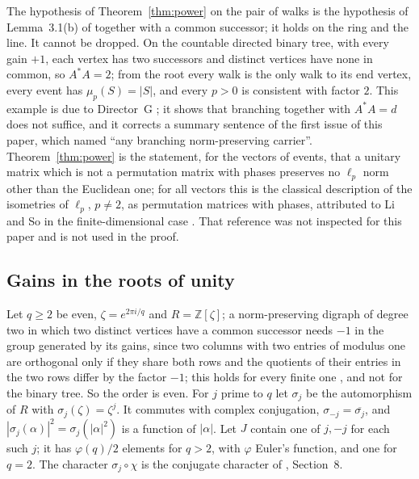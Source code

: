 The hypothesis of Theorem~\ref{thm:power} on the pair of walks is the hypothesis of Lemma~3.1(b) of \cite{g9} together with a common successor; it holds on the ring and the line. It cannot be dropped. On the countable directed binary tree, with every gain $+1$, each vertex has two successors and distinct vertices have none in common, so $A^*A=2$; from the root every walk is the only walk to its end vertex, every event has $\mu_p(S)=|S|$, and every $p>0$ is consistent with factor $2$. This example is due to Director~G \cite{dg}; it shows that branching together with $A^*A=d$ does not suffice, and it corrects a summary sentence of the first issue of this paper, which named ``any branching norm-preserving carrier''. Theorem~\ref{thm:power} is the statement, for the vectors of events, that a unitary matrix which is not a permutation matrix with phases preserves no $\ell_p$ norm other than the Euclidean one; for all vectors this is the classical description of the isometries of $\ell_p$, $p\ne2$, as permutation matrices with phases, attributed to Li and So in the finite-dimensional case \cite{liso}. That reference was not inspected for this paper and is not used in the proof.

\subsection{Gains in the roots of unity}
Let $q\ge2$ be even, $\zeta=e^{2\pi i/q}$ and $R=\mathbb{Z}[\zeta]$; a norm-preserving digraph of degree two in which two distinct vertices have a common successor needs $-1$ in the group generated by its gains, since two columns with two entries of modulus one are orthogonal only if they share both rows and the quotients of their entries in the two rows differ by the factor $-1$; this holds for every finite one \cite{g9}, and not for the binary tree. So the order is even. For $j$ prime to $q$ let $\sigma_j$ be the automorphism of $R$ with $\sigma_j(\zeta)=\zeta^j$. It commutes with complex conjugation, $\sigma_{-j}=\overline{\sigma_j}$, and $|\sigma_j(\alpha)|^2=\sigma_j(|\alpha|^2)$ is a function of $|\alpha|$. Let $J$ contain one of $j,-j$ for each such $j$; it has $\varphi(q)/2$ elements for $q>2$, with $\varphi$ Euler's function, and one for $q=2$. The character $\sigma_j\circ\chi$ is the conjugate character of \cite{g8}, Section~8.


